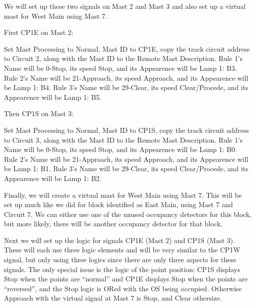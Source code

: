 We will set up these two signals on Mast 2 and Mast 3 and also set up a 
virtual mast for West Main using Mast 7.

First CP1E on Mast 2:

Set Mast Processing to Normal, Mast ID to CP1E, copy the track circuit address 
to Circuit 2, along with the Mast ID to the Remote Mast Description. Rule 1's
Name will be 0-Stop, its speed Stop, and its Appearence will be Lamp 1: B3.
Rule 2's Name will be 21-Approach, its speed Approach, and its Appearence will 
be Lamp 1: B4. Rule 3's Name will be 29-Clear, its speed Clear/Procede, and 
its Appearence will be Lamp 1: B5.

Then CP1S on Mast 3:

Set Mast Processing to Normal, Mast ID to CP1S, copy the track circuit address 
to Circuit 3, along with the Mast ID to the Remote Mast Description. Rule 1's
Name will be 0-Stop, its speed Stop, and its Appearence will be Lamp 1: B0.
Rule 2's Name will be 21-Approach, its speed Approach, and its Appearence will 
be Lamp 1: B1. Rule 3's Name will be 29-Clear, its speed Clear/Procede, and 
its Appearence will be Lamp 1: B2.

Finally, we will create a virtual mast for West Main using Mast 7.  This will 
be set up much like we did for block identified as East Main, using Mast 7 and 
Circuit 7.  We can either use one of the unused occupancy detectors for this 
block, but more likely, there will be another occupancy detector for that 
block.

Next we will set up the logic for signals CP1E (Mast 2) and CP1S (Mast 3).  
These will each use three logic elements and will be very similar to the CP1W 
signal, but only using three logics since there are only three aspects for 
these signals.  The only special issue is the logic of the point position: 
CP1S displays Stop when the points are ``normal'' and CP1E displays Stop when 
the points are ``reversed'', and the Stop logic is ORed with the OS being 
occupied. Otherwise Approach with the virtual signal at Mast 7 is Stop, and 
Clear othersize.

